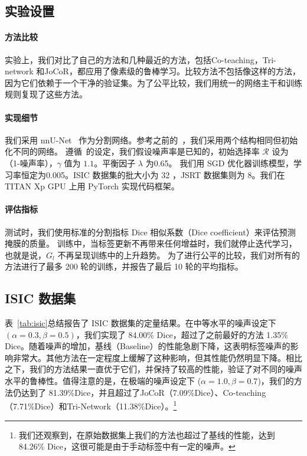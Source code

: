 \subsection{实验设置}
\paragraph{方法比较}
实验上，我们对比了自己的方法和几种最近的方法，包括Co-teaching\citep{Han2018CoteachingRT}，Tri-network\citep{Zhang2020RobustMI} 和JoCoR\citep{Wei2020CombatingNL}，都应用了像素级的鲁棒学习。比较方法不包括像\citet{ mirikharaji2019learning, Zhang2020CharacterizingLE}这样的方法，因为它们依赖于一个干净的验证集。为了公平比较，我们用统一的网络主干和训练规则复现了这些方法。

\paragraph{实现细节}
我们采用 nnU-Net~\cite{Isensee2020nnUNetAS} 作为分割网络。参考之前的~\citet{Malach2017DecouplingT}，我们采用两个结构相同但初始化不同的网络。
遵循~\citet{Han2018CoteachingRT}的设定，我们假设噪声率是已知的，初始选择率 $\mathcal{R}$ 设为（1-噪声率），$\gamma$ 值为 $1.1$。平衡因子 $\lambda$ 为0.65。
我们用 SGD 优化器训练模型，学习率恒定为0.005。ISIC 数据集的批大小为 32 ，JSRT 数据集则为 8。我们在 TITAN Xp GPU 上用 PyTorch 实现代码框架。

\paragraph{评估指标}
测试时，我们使用标准的分割指标 Dice 相似系数（Dice coefficient）来评估预测掩膜的质量。
训练中，当标签更新不再带来任何增益时，我们就停止迭代学习，也就是说，$G_l$ 不再呈现训练中的上升趋势。
为了进行公平的比较，我们对所有的方法进行了最多 200 轮的训练，并报告了最后 10 轮的平均指标。

\subsection{ISIC 数据集}

表~\ref{tab:isic}总结报告了 ISIC 数据集的定量结果。在中等水平的噪声设定下 $(\alpha=0.3, \beta=0.5)$，我们实现了 84.00\% Dice，超过了之前最好的方法 1.35\% Dice。随着噪声的增加，基线（Baseline）的性能急剧下降，这表明标签噪声的影响非常大。其他方法在一定程度上缓解了这种影响，但其性能仍然明显下降。相比之下，我们的方法结果一直优于它们，并保持了较高的性能，验证了对不同的噪声水平的鲁棒性。值得注意的是，在极端的噪声设定下 ($\alpha=1.0, \beta=0.7$)，我们的方法仍达到了 81.39\%Dice，并且超过了JoCoR（7.09\%Dice）、Co-teaching（7.71\%Dice）和Tri-Network（11.38\%Dice）。\footnote{我们还观察到，在原始数据集上我们的方法也超过了基线的性能，达到 84.26\% Dice，这很可能是由于手动标签中有一定的噪声。}


